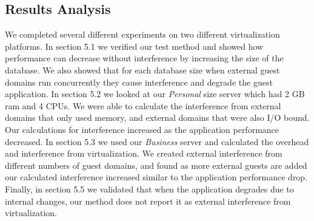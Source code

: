 \subsection{Results Analysis}
We completed several different experiments on two different virtualization platforms.  In section 5.1 we verified our test method and showed how performance can decrease without interference by increasing the size of the database.  We also showed that for each database size when external guest domains run concurrently they cause interference and degrade the guest application.  In section 5.2 we looked at our \emph{Personal} size server which had 2 GB ram and 4 CPUs.  We were able to calculate the interference from external domains that only used memory, and external domains that were also I/O bound.  Our calculations for interference increased as the application performance decreased.  In section 5.3 we used our \emph{Business} server and calculated the overhead and interference from virtualization.  We created external interference from different numbers of guest domains, and found as more external guests are added our calculated interference increased similar to the application performance drop.  Finally, in section 5.5 we validated that when the application degrades due to internal changes, our method does not report it as external interference from virtualization.



